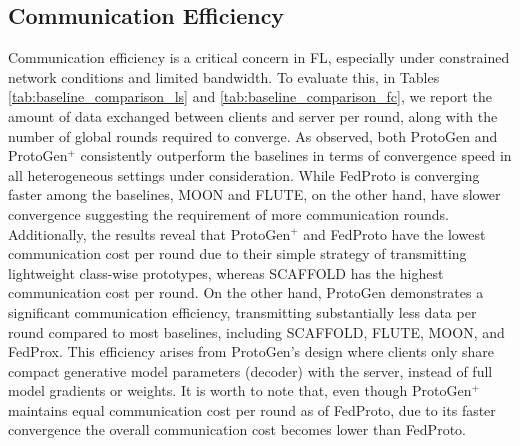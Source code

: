 \documentclass[lettersize,journal]{IEEEtran}
\newcommand{\todo}[1]{\textcolor{red}{[#1]}}
\begin{document}

\subsection{Communication Efficiency}

Communication efficiency is a critical concern in FL, especially under constrained network conditions and limited bandwidth. To evaluate this, in Tables \ref{tab:baseline_comparison_ls} and \ref{tab:baseline_comparison_fc}, we report the amount of data exchanged between clients and server per round, along with the number of global rounds required to converge. As observed, both \textsf{ProtoGen} and \textsf{ProtoGen}$^+$ consistently outperform the baselines in terms of convergence speed in all heterogeneous settings under consideration.
While FedProto is converging faster among the baselines, MOON and FLUTE, on the other hand, have slower convergence suggesting the requirement of more communication rounds. Additionally, the results reveal that \textsf{ProtoGen}$^+$ and FedProto have the lowest communication cost per round due to their simple strategy of transmitting lightweight class-wise prototypes, whereas SCAFFOLD has the highest communication cost per round. On the other hand, \textsf{ProtoGen} demonstrates a significant communication efficiency, transmitting substantially less data per round compared to most baselines, including SCAFFOLD, FLUTE, MOON, and FedProx. This efficiency arises from \textsf{ProtoGen}’s design where clients only share compact generative model parameters (decoder) with the server, instead of full model gradients or weights. It is worth to note that, even though \textsf{ProtoGen}$^+$ maintains equal communication cost per round as of FedProto, due to its faster convergence the overall communication cost becomes lower than FedProto.
\end{document}

